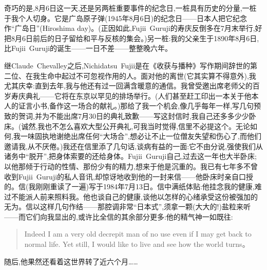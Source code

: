奇巧的是,8月6日这一天,还是另两桩重要事件的纪念日,一桩具有历史的分量,一桩于我个人切身。它是广岛原子弹(1945年8月6日)的纪念日——日本人把它纪念作“广岛日”(Hiroshima day)。(正因如此,Fujii~Guruji的寿庆反倒多在7月末举行,好把8月6日前后的日子留给和平与反核的集会。)另一桩:我的父亲生于1890年8月6日,比Fujii~Guruji的诞生——一日不差——整整晚六年。

继Claude~Chevalley之后,Nichidatsu~Fujii是在《收获与播种》写作期间辞世的第二位、在我生命中起过不可忽视作用的人。面对他的离世(它其实算不得意外),我尤其庆幸:直到去年,我与他还有过一回满含暖意的通信。我曾受邀出席老师父的百岁寿庆典礼——它将在东京以罕见的排场举行。(人们甚至赶工印出一本关于他本人的证言小书,备作这一场合的献礼。)那给了我一个机会,像几乎每年一样,写几句预致的贺词,并为不能出席7月30日的典礼致歉——写这封信时,我自己还多多少少卧床。(诚然,我也不怎么喜欢大型公开典礼,可我当时觉得,信里不必提这个。无论如何,我一味固执地谢绝出席任何“大场合”,想必让不止一位僧友失望和伤心了\dmark{},而他们邀请我,从不厌倦。)我还在信里添了几句话,谈病有益的一面:它不由分说,强使我们从诸务中“脱开”,把身体索要的还给身体。Fujii~Guruji自己,过去这一年也大半卧床;以他那倾于行动的性情、那份少有的精力,想来于他是沉重的。我已有七年多不曾收到Fujii~Guruji的私人音讯,却惊讶地收到他的一封来信——他卧床时亲自口授的。信(我刚刚重读了一遍)写于1984年7月13日。信中满纸体贴:他挂念我的健康,难过不能派人前来照料我。他也谈自己的健康,谈他以怎样的心绪承受这份被强加的无为。信以这样几句作结——那腔调非常“日本式”,须拿一颗(大大的!)盐粒来听——而它们向我显出的,或许比全信的其余部分更多:他的精气神一如既往:

\begin{quote}
Indeed I am a very old decrepit man of no use even if I may get back to normal life. Yet still,
I would like to live and see how the world turns。
\end{quote}

随后,他果然还看着这世界转了近六个月……

